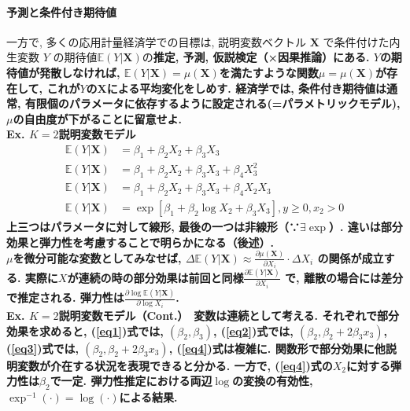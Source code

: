 \documentclass[paper=a4paper,fontsize=10pt]{jlreq}
\begin{document}
\paragraph{予測と条件付き期待値}
一方で, 多くの応用計量経済学での目標は, 説明変数ベクトル $\mathbf{X}$ で条件付けた内生変数 $Y$ の期待値$\mathbb{E}(Y|\mathbf{X})$の\rmfamily\mcfamily\bfseries{推定, 予測, 仮説検定（×因果推論）}\mdseries にある. $Y$の期待値が発散しなければ, $\mathbb{E}(Y|\mathbf{X})=\mu(\mathbf{X})$を満たすような関数$\mu=\mu(\mathbf{X})$が存在して, これが$Y$の$\mathbf{X}$による平均変化をしめす. 経済学では, 条件付き期待値は通常, 有限個のパラメータに依存するように設定される(=\rmfamily\mcfamily\bfseries{パラメトリックモデル}\mdseries ), $\mu$の自由度が下がることに留意せよ.\\

\rmfamily\mcfamily\bfseries{Ex. $K=2$説明変数モデル}\mdseries　
\begin{align}
  \label{eq1}
  \mathbb{E}(Y|\mathbf{X})&=\beta_1+\beta_2X_{2}+\beta_3X_{3}\\
  \label{eq2}
  \mathbb{E}(Y|\mathbf{X})&=\beta_1+\beta_2X_{2}+\beta_3X_{3}+\beta_4X_{3}^{2}\\
  \label{eq3}
  \mathbb{E}(Y|\mathbf{X})&=\beta_1+\beta_2X_{2}+\beta_3X_{3}+\beta_4X_{2}X_{3}\\
  \label{eq4}
  \mathbb{E}(Y|\mathbf{X})&=\exp[\beta_1+\beta_2\log X_{2}+\beta_3X_{3}], y ≥ 0, x_{2} > 0
\end{align}
上三つは\rmfamily\mcfamily\bfseries{パラメータに対して線形}\mdseries , 最後の一つは非線形（∵$\exists\exp$）. 違いは部分効果と弾力性を考慮することで明らかになる（後述）.\\

$\mu$を微分可能な変数としてみなせば, $\Delta\mathbb{E}(Y|\mathbf{X})\approx \frac{\partial \mu(\mathbf{X})}{\partial X_i}\cdot \Delta X_i$ の関係が成立する. 実際に$X$が連続の時の部分効果は前回と同様$\frac{\partial \mathbb{E}(Y|\mathbf{X})}{\partial X_i}$ で, 離散の場合には差分で推定される. 弾力性は$\frac{\partial \log \mathbb{E}(Y|\mathbf{X})}{\partial \log X_i}$.\\

\rmfamily\mcfamily\bfseries{Ex. $K=2$説明変数モデル（Cont.）}\mdseries　変数は連続として考える. それぞれで部分効果を求めると, (\ref{eq1})式では, $(\beta_2, \beta_3)$, (\ref{eq2})式では, $(\beta_2, \beta_2+2\beta_3x_3)$, (\ref{eq3})式では, $(\beta_2, \beta_2+2\beta_3x_3)$, (\ref{eq4})式は複雑に. 関数形で部分効果に他説明変数が介在する状況を表現できると分かる. 一方で,  (\ref{eq4})式の$X_2$に対する弾力性は$\beta_2$で一定. 弾力性推定における両辺$\log$の変換の有効性, $\exp^{-1}(\cdot)=\log(\cdot)$による結果.\\
\end{document}

